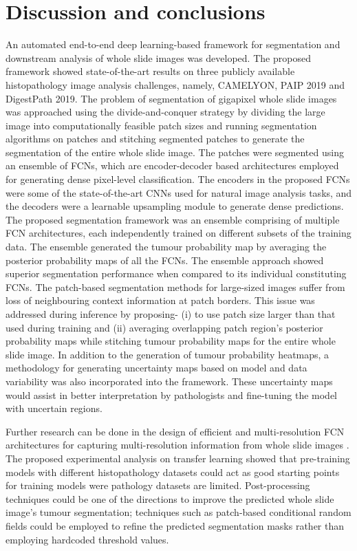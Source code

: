 \documentclass[times,twocolumn,final,authoryear]{tmp}
\begin{document}
\section{Discussion and conclusions}
\label{path_sec:discussion}
An automated end-to-end deep learning-based framework for segmentation and downstream analysis of whole slide images was developed. The proposed framework showed state-of-the-art results on three publicly available histopathology image analysis challenges, namely, CAMELYON, PAIP 2019 and DigestPath 2019. The problem of segmentation of gigapixel whole slide images was approached using the divide-and-conquer strategy by dividing the large image into computationally feasible patch sizes and running segmentation algorithms on patches and stitching segmented patches to generate the segmentation of the entire whole slide image. The patches were segmented using an ensemble of FCNs, which are encoder-decoder based architectures employed for generating dense pixel-level classification. The encoders in the proposed FCNs were some of the state-of-the-art CNNs used for natural image analysis tasks, and the decoders were a learnable upsampling module to generate dense predictions. The proposed segmentation framework was an ensemble comprising of multiple FCN architectures, each independently trained on different subsets of the training data. The ensemble generated the tumour probability map by averaging the posterior probability maps of all the FCNs. The ensemble approach showed superior segmentation performance when compared to its individual constituting FCNs. The patch-based segmentation methods for large-sized images suffer from loss of neighbouring context information at patch borders. This issue was addressed during inference by proposing- (i) to use patch size larger than that used during training and (ii) averaging overlapping patch region's posterior probability maps while stitching tumour probability maps for the entire whole slide image. In addition to the generation of tumour probability heatmaps, a methodology for generating uncertainty maps based on model and data variability was also incorporated into the framework. These uncertainty maps would assist in better interpretation by pathologists and fine-tuning the model with uncertain regions.

Further research can be done in the design of efficient and multi-resolution FCN architectures for capturing multi-resolution information from whole slide images \citep{graham2019mild}. The proposed experimental analysis on transfer learning showed that pre-training models with different histopathology datasets could act as good starting points for training models were pathology datasets are limited. Post-processing techniques could be one of the directions to improve the predicted whole slide image's tumour segmentation; techniques such as patch-based conditional random fields \citep{krahenbuhl2011efficient, li2018cancer} could be employed to refine the predicted segmentation masks rather than employing hardcoded threshold values.
\end{document}
